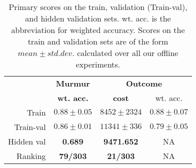 
\begin{table}[!htp]
\centering
\begin{tabular}{r|c|c|c}
    \hline
    & \textbf{Murmur} & \multicolumn{2}{c}{\textbf{Outcome}} \\
    & \textbf{wt. acc.} & \multicolumn{1}{c}{\textbf{cost}} & \multicolumn{1}{c}{wt. acc.} \\ \hline
    Train & $0.88\pm 0.05$ & $8452\pm 2324$ & $0.88\pm 0.07$ \\
    Train-val & $0.86\pm 0.01$ & $11341\pm 336$ & $0.79\pm 0.05$ \\ \hline
    Hidden val & \textbf{0.689} & \textbf{9471.652} & NA \\
    Ranking & \textbf{79/303} & \textbf{21/303} & NA \\ \hline
\end{tabular}
\caption{Primary scores on the train, validation (Train-val), and hidden validation sets. wt. acc. is the abbreviation for weighted accuracy. Scores on the train and validation sets are of the form $mean \pm std. dev.$ calculated over all our offline experiments.}
\label{tab:challenge_scores}
\end{table}
